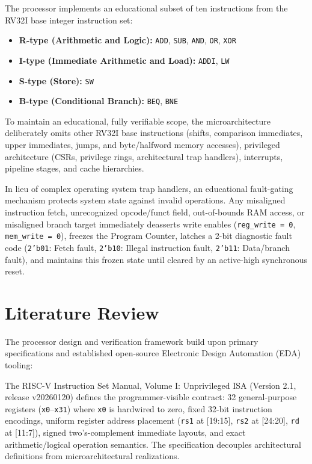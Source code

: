 \documentclass[conference]{IEEEtran}
\begin{document}
The processor implements an educational subset of ten instructions from the RV32I base integer instruction set:
\begin{itemize}
\item \textbf{R-type (Arithmetic and Logic):} \texttt{ADD}, \texttt{SUB}, \texttt{AND}, \texttt{OR}, \texttt{XOR}
\item \textbf{I-type (Immediate Arithmetic and Load):} \texttt{ADDI}, \texttt{LW}
\item \textbf{S-type (Store):} \texttt{SW}
\item \textbf{B-type (Conditional Branch):} \texttt{BEQ}, \texttt{BNE}
\end{itemize}

To maintain an educational, fully verifiable scope, the microarchitecture deliberately omits other RV32I base instructions (shifts, comparison immediates, upper immediates, jumps, and byte/halfword memory accesses), privileged architecture (CSRs, privilege rings, architectural trap handlers), interrupts, pipeline stages, and cache hierarchies.

In lieu of complex operating system trap handlers, an educational fault-gating mechanism protects system state against invalid operations. Any misaligned instruction fetch, unrecognized opcode/funct field, out-of-bounds RAM access, or misaligned branch target immediately deasserts write enables (\texttt{reg\_write = 0}, \texttt{mem\_write = 0}), freezes the Program Counter, latches a 2-bit diagnostic fault code (\texttt{2'b01}: Fetch fault, \texttt{2'b10}: Illegal instruction fault, \texttt{2'b11}: Data/branch fault), and maintains this frozen state until cleared by an active-high synchronous reset.

\section{Literature Review}
The processor design and verification framework build upon primary specifications and established open-source Electronic Design Automation (EDA) tooling:

The RISC-V Instruction Set Manual, Volume I: Unprivileged ISA (Version 2.1, release v20260120) \cite{ref1} defines the programmer-visible contract: 32 general-purpose registers (\texttt{x0}--\texttt{x31}) where \texttt{x0} is hardwired to zero, fixed 32-bit instruction encodings, uniform register address placement (\texttt{rs1} at [19:15], \texttt{rs2} at [24:20], \texttt{rd} at [11:7]), signed two's-complement immediate layouts, and exact arithmetic/logical operation semantics. The specification decouples architectural definitions from microarchitectural realizations.
\end{document}
